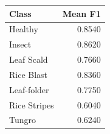 \begin{tabular}{lr}
\toprule
Class & Mean F1 \\
\midrule
Healthy & 0.8540 \\
Insect & 0.8620 \\
Leaf Scald & 0.7660 \\
Rice Blast & 0.8360 \\
Leaf-folder & 0.7750 \\
Rice Stripes & 0.6040 \\
Tungro & 0.6240 \\
\bottomrule
\end{tabular}
